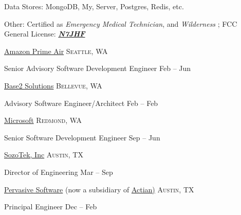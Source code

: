 \documentclass[10pt,letterpaper]{article}
\begin{document}
\vspace{0.5em}\inlineheadsection
{Data Stores:}
{MongoDB,  My,   Server, Postgres, Redis, etc.}

\vspace{0.5em}\inlineheadsection
{Other:}
{Certified as \emph{Emergency Medical Technician}, and \emph{Wilderness }; {FCC General License: {\href{https://wireless2.fcc.gov/UlsApp/UlsSearch/license.jsp?licKey=3095481}{ \emph{\textbf{N7JHF}}}}}}

\vspace{1em}\spacedhrule{0.5em}{-0.4em}


	\headedsection
	{\href{https://amazon.com/}{Amazon Prime Air}}
	{\textsc{Seattle, WA}} {%
	
	\headedsubsection
	{Senior Advisory Software Development Engineer}
	{Feb  -- Jun }
	{}	
	}

\vspace*{1em}

	\headedsection
	{\href{https://base2s.com/}{Base2 Solutions}}
	{\textsc{Bellevue, WA}} {%
		
		\headedsubsection
		{Advisory Software Engineer/Architect}
		{Feb  -- Feb }
		{}	
	}
	
	\vspace*{1em}

	\headedsection
	{\href{https://www.microsoft.com/en-us/}{Microsoft}}
	{\textsc{Redmond, WA}} {%
	
		\headedsubsection
		{Senior Software Development Engineer}
		{Sep  -- Jun }
		{}	
	}
		
	\vspace*{1em}
	
	\headedsection
	{\href{http://www.zoominfo.com/c/SozoTek-Inc/53446018}{SozoTek, Inc}}
	{\textsc{Austin, TX}} {%
		
		\headedsubsection
		{Director of Engineering}
		{Mar  -- Sep }
			
	}

	\vspace*{1em}
	\headedsection
	{\href{http://www.pervasive.com/}{Pervasive Software} (now a subsidiary of \href{https://www.actian.com/}{Actian)}}
	{\textsc{Austin, TX}} {%
				
		\headedsubsection
		{Principal Engineer}
		{Dec  -- Feb }

	}
					
\end{document}
